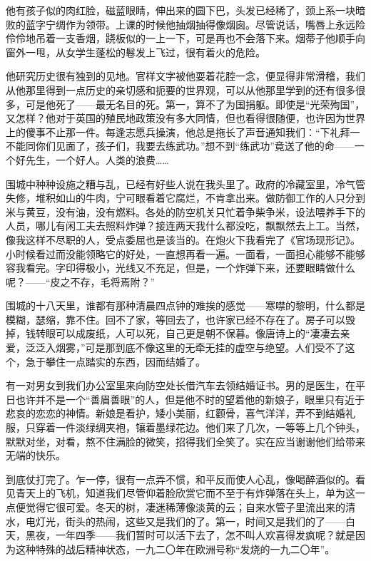 \par 他有孩子似的肉红脸，磁蓝眼睛，伸出来的圆下巴，头发已经稀了，颈上系一块暗败的蓝字宁绸作为领带。上课的时候他抽烟抽得像烟囱。尽管说话，嘴唇上永远险伶伶地吊着一支香烟，跷板似的一上一下，可是再也不会落下来。烟蒂子他顺手向窗外一甩，从女学生蓬松的鬈发上飞过，很有着火的危险。
\par 他研究历史很有独到的见地。官样文字被他耍着花腔一念，便显得非常滑稽，我们从他那里得到一点历史的亲切感和扼要的世界观，可以从他那里学到的还有很多很多，可是他死了——最无名目的死。第一，算不了为国捐躯。即使是“光荣殉国”，又怎样？他对于英国的殖民地政策没有多大同情，但也看得很随便，也许因为世界上的傻事不止那一件。每逢志愿兵操演，他总是拖长了声音通知我们：“下礼拜一不能同你们见面了，孩子们，我要去练武功。”想不到“练武功”竟送了他的命——一个好先生，一个好人。人类的浪费……
\par 围城中种种设施之糟与乱，已经有好些人说在我头里了。政府的冷藏室里，冷气管失修，堆积如山的牛肉，宁可眼看着它腐烂，不肯拿出来。做防御工作的人只分到米与黄豆，没有油，没有燃料。各处的防空机关只忙着争柴争米，设法喂养手下的人员，哪儿有闲工夫去照料炸弹？接连两天我什么都没吃，飘飘然去上工。当然，像我这样不尽职的人，受点委屈也是该当的。在炮火下我看完了《官场现形记》。小时候看过而没能领略它的好处，一直想再看一遍。一面看，一面担心能够不能够容我看完。字印得极小，光线又不充足，但是，一个炸弹下来，还要眼睛做什么呢？——“皮之不存，毛将焉附？”
\par 围城的十八天里，谁都有那种清晨四点钟的难挨的感觉——寒噤的黎明，什么都是模糊，瑟缩，靠不住。回不了家，等回去了，也许家已经不存在了。房子可以毁掉，钱转眼可以成废纸，人可以死，自己更是朝不保暮。像唐诗上的“凄凄去亲爱，泛泛入烟雾，”可是那到底不像这里的无牵无挂的虚空与绝望。人们受不了这个，急于攀住一点踏实的东西，因而结婚了。
\par 有一对男女到我们办公室里来向防空处长借汽车去领结婚证书。男的是医生，在平日也许并不是一个“善眉善眼”的人，但是他不时的望着他的新娘子，眼里只有近于悲哀的恋恋的神情。新娘是看护，矮小美丽，红颧骨，喜气洋洋，弄不到结婚礼服，只穿着一件淡绿绸夹袍，镶着墨绿花边。他们来了几次，一等等上几个钟头，默默对坐，对看，熬不住满脸的微笑，招得我们全笑了。实在应当谢谢他们给带来无端的快乐。
\par 到底仗打完了。乍一停，很有一点弄不惯，和平反而使人心乱，像喝醉酒似的。看见青天上的飞机，知道我们尽管仰着脸欣赏它而不至于有炸弹落在头上，单为这一点便觉得它很可爱。冬天的树，凄迷稀薄像淡黄的云；自来水管子里流出来的清水，电灯光，街头的热闹，这些又是我们的了。第一，时间又是我们的了——白天，黑夜，一年四季——我们暂时可以活下去了，怎不叫人欢喜得发疯呢？就是因为这种特殊的战后精神状态，一九二〇年在欧洲号称“发烧的一九二〇年”。
